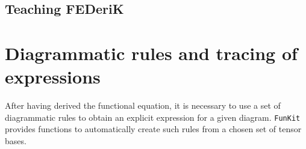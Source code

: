 \documentclass[10pt,prd,nofootinbib,superscriptaddress,twocolumn]{revtex4-2}
\newcommand{\FunKit}{\texttt{FunKit}\xspace}
\begin{document}
\subsection{Teaching FEDeriK}
\label{sec:FEDeriK_teaching}


\section{Diagrammatic rules and tracing of expressions}
\label{sec:DiRK}

After having derived the functional equation, it is necessary to use a set of diagrammatic rules to obtain an explicit expression for a given diagram. \FunKit provides functions to automatically create such rules from a chosen set of tensor bases.
\end{document}
